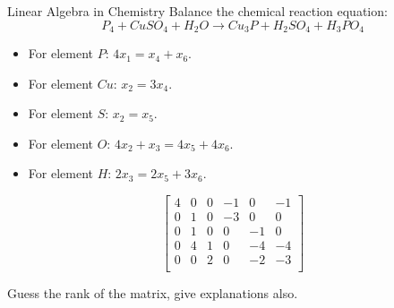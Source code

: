 \documentclass{beamer}
\begin{document}
\begin{frame}{Linear Algebra in Chemistry}
Balance the chemical reaction equation:
\begin{equation*}
    P_4+CuSO_4+H_2O\rightarrow Cu_3P+H_2SO_4+H_3PO_4
\end{equation*}

\begin{itemize}
    \item For element $P$: $4x_1=x_4+x_6$.
    \item For element $Cu$: $x_2=3x_4$.
    \item For element $S$: $x_2=x_5$.
    \item For element $O$: $4x_2+x_3=4x_5+4x_6$.
    \item For element $H$: $2x_3=2x_5+3x_6$.
\end{itemize}

\begin{equation*}
    \left[ \begin{matrix}
        4&		0&		0&		-1&		0&		-1\\
        0&		1&		0&		-3&		0&		0\\
        0&		1&		0&		0&		-1&		0\\
        0&		4&		1&		0&		-4&		-4\\
        0&		0&		2&		0&		-2&		-3\\
    \end{matrix} \right]
\end{equation*}

Guess the rank of the matrix, give explanations also.
\end{frame}
\end{document}
